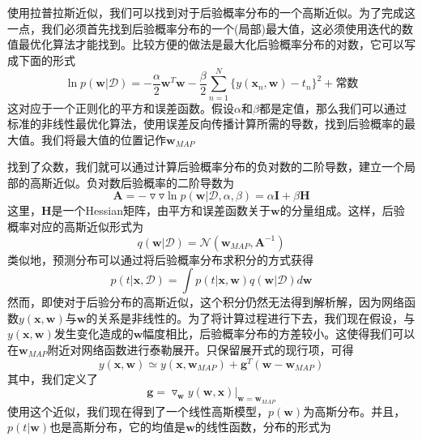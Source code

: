使用拉普拉斯近似，我们可以找到对于后验概率分布的一个高斯近似。为了完成这一点，我们必须首先找到后验概率分布的一个(局部)最大值，这必须使用迭代的数值最优化算法才能找到。比较方便的做法是最大化后验概率分布的对数，它可以写成下面的形式
\begin{equation}
	\ln p(\boldsymbol{w}|\mathcal{D})=-\frac{\alpha}{2}\boldsymbol{w}^T\boldsymbol{w}-\frac{\beta}{2}\sum_{n=1}^{N}\{y(\boldsymbol{x}_n,\boldsymbol{w})-t_n \}^2+\text{常数}
\end{equation}
这对应于一个正则化的平方和误差函数。假设$\alpha$和$\beta$都是定值，那么我们可以通过标准的非线性最优化算法，使用误差反向传播计算所需的导数，找到后验概率的最大值。我们将最大值的位置记作$\boldsymbol{w}_{MAP}$

找到了众数，我们就可以通过计算后验概率分布的负对数的二阶导数，建立一个局部的高斯近似。负对数后验概率的二阶导数为
\begin{equation}
	\boldsymbol{A}=-\triangledown\triangledown \ln p(\boldsymbol{w}|\mathcal{D},\alpha,\beta)=\alpha\boldsymbol{I}+\beta\boldsymbol{H}
\end{equation}
这里，$\boldsymbol{H}$是一个Hessian矩阵，由平方和误差函数关于$\boldsymbol{w}$的分量组成。这样，后验概率对应的高斯近似形式为
\begin{equation}
	q(\boldsymbol{w}|\mathcal{D})=\mathcal{N}(\boldsymbol{w}_{MAP},\boldsymbol{A}^{-1})
\end{equation}
类似地，预测分布可以通过将后验概率分布求积分的方式获得
\begin{equation}
	p(t|\boldsymbol{x},\mathcal{D})=\int p(t|\boldsymbol{x},\boldsymbol{w})q(\boldsymbol{w}|\mathcal{D})d\boldsymbol{w}
\end{equation}
然而，即使对于后验分布的高斯近似，这个积分仍然无法得到解析解，因为网络函数$y(\boldsymbol{x},\boldsymbol{w})$与$\boldsymbol{w}$的关系是非线性的。为了将计算过程进行下去，我们现在假设，与$y(\boldsymbol{x},\boldsymbol{w})$发生变化造成的$\boldsymbol{w}$幅度相比，后验概率分布的方差较小。这使得我们可以在$\boldsymbol{w}_{MAP}$附近对网络函数进行泰勒展开。只保留展开式的现行项，可得
\begin{equation}
	y(\boldsymbol{x},\boldsymbol{w})\simeq y(\boldsymbol{x},\boldsymbol{w}_{MAP})+\boldsymbol{g}^T(\boldsymbol{w}-\boldsymbol{w}_{MAP})
\end{equation}
其中，我们定义了
\begin{equation}
	\boldsymbol{g}=\triangledown_{\boldsymbol{w}}y(\boldsymbol{w},\boldsymbol{x})|_{\boldsymbol{w}=\boldsymbol{w}_{MAP}}
\end{equation}
使用这个近似，我们现在得到了一个线性高斯模型，$p(\boldsymbol{w})$为高斯分布。并且，$p(t|\boldsymbol{w})$也是高斯分布，它的均值是$\boldsymbol{w}$的线性函数，分布的形式为
